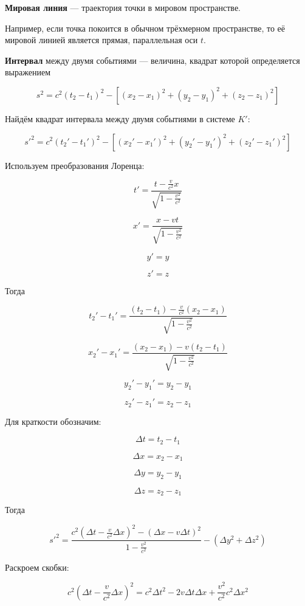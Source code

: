 \documentclass[a4paper,12pt]{article}
\begin{document}
\begin{definitionbox}
\textbf{Мировая линия} — траектория точки в мировом пространстве.
\end{definitionbox}

Например, если точка покоится в обычном трёхмерном пространстве, то её мировой линией является прямая, параллельная оси \(t\).

\begin{definitionbox}
\textbf{Интервал} между двумя событиями — величина, квадрат которой определяется выражением

\[
s^2
=
c^2(t_2 - t_1)^2
-
\left[
(x_2 - x_1)^2
+
(y_2 - y_1)^2
+
(z_2 - z_1)^2
\right]
\]

\end{definitionbox}

Найдём квадрат интервала между двумя событиями в системе \(K'\):

\[
s'^2
=
c^2(t_2' - t_1')^2
-
\left[
(x_2' - x_1')^2
+
(y_2' - y_1')^2
+
(z_2' - z_1')^2
\right]
\]

Используем преобразования Лоренца:

\[
t' =
\frac{t - \frac{v}{c^2}x}{\sqrt{1 - \frac{v^2}{c^2}}}
\]

\[
x' =
\frac{x - vt}{\sqrt{1 - \frac{v^2}{c^2}}}
\]

\[
y' = y
\]

\[
z' = z
\]

Тогда

\[
t_2' - t_1'
=
\frac{
(t_2 - t_1) - \frac{v}{c^2}(x_2 - x_1)
}{
\sqrt{1 - \frac{v^2}{c^2}}
}
\]

\[
x_2' - x_1'
=
\frac{
(x_2 - x_1) - v(t_2 - t_1)
}{
\sqrt{1 - \frac{v^2}{c^2}}
}
\]

\[
y_2' - y_1' = y_2 - y_1
\]

\[
z_2' - z_1' = z_2 - z_1
\]

Для краткости обозначим:

\[
\Delta t = t_2 - t_1
\]

\[
\Delta x = x_2 - x_1
\]

\[
\Delta y = y_2 - y_1
\]

\[
\Delta z = z_2 - z_1
\]

Тогда

\[
s'^2
=
\frac{
c^2
\left(
\Delta t - \frac{v}{c^2}\Delta x
\right)^2
-
\left(
\Delta x - v\Delta t
\right)^2
}{
1 - \frac{v^2}{c^2}
}
-
(\Delta y^2 + \Delta z^2)
\]

Раскроем скобки:

\[
c^2
\left(
\Delta t - \frac{v}{c^2}\Delta x
\right)^2
=
c^2 \Delta t^2
-
2v \Delta t \Delta x
+
\frac{v^2}{c^2} c^2 \Delta x^2
\]
\end{document}

